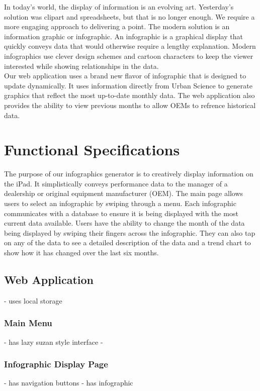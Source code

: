 \documentclass[11pt,a4paper,oneside]{article}
\begin{document}
In today's world, the display of information is an evolving art. Yesterday's solution was clipart and spreadsheets, but that is no longer enough. We require a more engaging approach to delivering a point. The modern solution is an information graphic or infographic. An infographic is a graphical display that quickly conveys data that would otherwise require a lengthy explanation. Modern infographics use clever design schemes and cartoon characters to keep the viewer interested while showing relationships in the data.\\


Our web application uses a brand new flavor of infographic that is designed to update dynamically. It uses information directly from Urban Science to generate graphics that reflect the most up-to-date monthly data. The web application also provides the ability to view previous months to allow OEMs to refrence historical data.\\

\newpage

\section{Functional Specifications}


The purpose of our infographics generator is to creatively display information on the iPad.  It simplistically conveys performance data to the manager of a dealership or original equipment manufacturer (OEM).  The main page allows users to select an infographic by swiping through a menu.  Each infographic communicates with a database to ensure it is being displayed with the most current data available.  Users have the ability to change the month of the data being displayed by swiping their fingers across the infographic.  They can also tap on any of the data to see a detailed description of the data and a trend chart to show how it has changed over the last six months.




\subsection {Web Application}
 - uses local storage


\subsubsection {Main Menu}
 - has lazy suzan style interface
 - 

\subsubsection {Infographic Display Page}
 - has navigation buttons
 - has infographic
\end{document}
